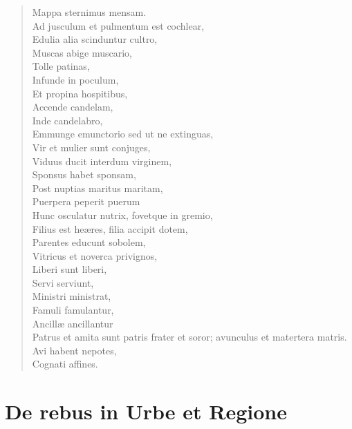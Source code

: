 \begin{verse}
  Mappa sternimus mensam.\\
  Ad jusculum et pulmentum est cochlear,\\
  Edulia alia scinduntur cultro,\\
  Muscas abige muscario,\\
  Tolle patinas,\\
  Infunde in poculum,\\
  Et propina hospitibus,\\
  Accende candelam,\\
  Inde candelabro,\\
  Emmunge emunctorio sed ut ne extinguas,\\
  Vir et mulier sunt conjuges,\\
  Viduus ducit interdum virginem,\\
  Sponsus habet sponsam,\\
  Post nuptias maritus maritam,\\
  Puerpera peperit puerum\\
  Hunc osculatur nutrix, fovetque in gremio,\\
  Filius est heæres, filia accipit dotem,\\
  Parentes educunt sobolem,\\
  Vitricus et noverca privignos,\\
  Liberi sunt liberi,\\
  Servi serviunt,\\
  Ministri ministrat,\\
  Famuli famulantur,\\
  Ancillæ ancillantur\\
  Patrus et amita sunt patris frater et soror; avunculus et matertera matris.\\
  Avi habent nepotes,\\
  Cognati affines.\\
\end{verse}



\chapter{De rebus in Urbe et Regione}


